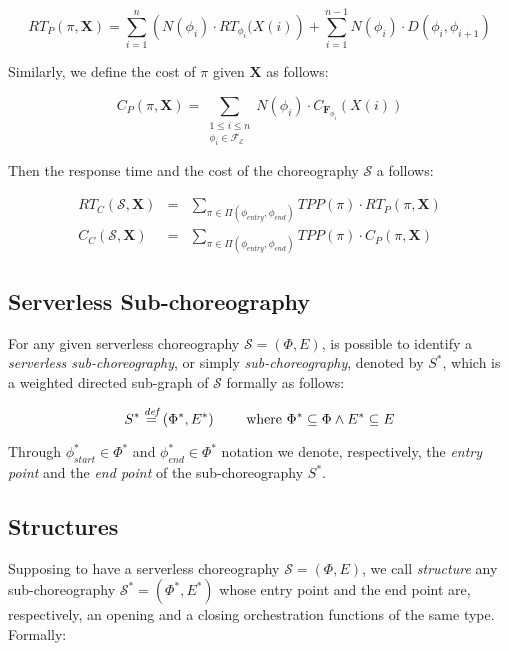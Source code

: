 \begin{equation}
	RT_P(\pi, \textbf{X}) = \sum_{i = 1}^n \left(  N(\phi_i) \cdot RT_{\phi_i} (X(i) \right)  + \sum_{i = 1}^{n-1} N(\phi_i) \cdot D(\phi_i,\phi_{i+1})
\end{equation}

Similarly, we define the cost of $\pi$ given $\textbf{X}$ as follows:

\begin{equation}
	C_P(\pi, \textbf{X}) = \sum_{\substack{1\le i\le n\\ \phi_i \in \mathscr{F_E}}} N(\phi_i) \cdot C_{\textbf{F}_{\phi_i}} (X(i))
\end{equation}


Then the response time and the cost of the choreography $\mathcal{S}$ a follows:

\begin{eqnarray}
	RT_C(\mathcal{S}, \textbf{X}) & = & \sum_{\pi \in \Pi(\phi_{entry}, \phi_{end})} TPP(\pi) \cdot RT_{P}(\pi, \textbf{X}) \\
	C_C(\mathcal{S}, \textbf{X}) & = & \sum_{\pi \in \Pi(\phi_{entry}, \phi_{end})} TPP(\pi) \cdot C_{P}(\pi, \textbf{X}) 
\end{eqnarray}

\subsection{Serverless Sub-choreography}

For any given serverless choreography $\mathcal{S} = (\Phi,E)$, is possible to identify a \textit{serverless sub-choreography}, or simply \textit{sub-choreography}, denoted by $S^*$, which is a weighted directed sub-graph of $\mathcal{S}$ formally as follows:

\begin{equation}
	S^* \overset{\textit{def}}{=} (\Phi^*,E^*) \qquad \text{ where } \Phi^* \subseteq \Phi \wedge E^* \subseteq E
\end{equation}

Through $\phi_{start}^* \in \Phi^*$ and $\phi_{end}^* \in \Phi^*$ notation we denote, respectively, the \textit{entry point} and the \textit{end point} of the sub-choreography $S^*$.

\subsection{Structures}

Supposing to have a serverless choreography $\mathcal{S} = (\Phi,E)$, we call \textit{structure} any sub-choreography $\mathcal{S}^*= (\Phi^*,E^*)$ whose entry point and the end point are, respectively, an opening and a closing orchestration functions of the same type. Formally:

